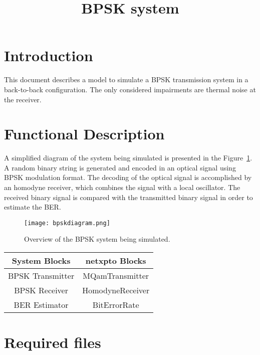 \documentclass[a4paper]{article}
\title{BPSK system}
\author{ }
\date{ }
\newcommand{\onlyinsubfile}[1]{#1}
\newcommand{\notinsubfile}[1]{}
\begin{document}
\renewcommand{\onlyinsubfile}[1]{}
\renewcommand{\notinsubfile}[1]{#1}

\maketitle

\section{Introduction}

This document describes a model to simulate a BPSK transmission system in a back-to-back configuration.
The only considered impairments are thermal noise at the receiver.

\section{Functional Description}

A simplified diagram of the system being simulated is presented in the Figure~\ref{fig:homodynesystem}.
A random binary string is generated and encoded in an optical signal using BPSK modulation format.
The decoding of the optical signal is accomplished by an homodyne receiver, which combines the signal with a local oscillator.
The received binary signal is compared with the transmitted binary signal in order to estimate the BER.

\begin{figure}[h]
\centering
\texttt{[image: bpskdiagram.png]}
\caption{Overview of the BPSK system being simulated.}
\label{fig:homodynesystem}
\end{figure}

\begin{table}[H]
\centering
\begin{tabular}{c|c}
System Blocks    & netxpto Blocks   \\ \hline
BPSK Transmitter & MQamTransmitter  \\
BPSK Receiver    & HomodyneReceiver \\
BER Estimator    & BitErrorRate
\end{tabular}
\end{table}

\section{Required files}\label{Required files}
\end{document}

